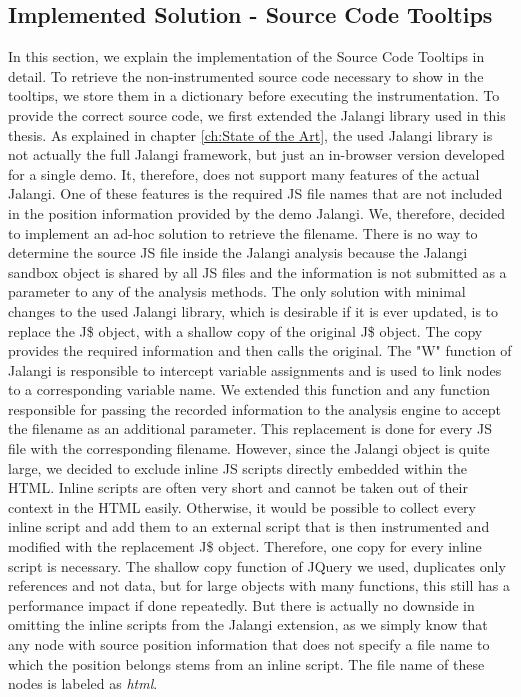 \subsection{Implemented Solution - Source Code Tooltips}
In this section, we explain the implementation of the Source Code Tooltips in detail. To retrieve the non-instrumented source code necessary to show in the tooltips, we store them in a dictionary before executing the instrumentation. To provide the correct source code, we first extended the Jalangi library used in this thesis. As explained in chapter \ref{ch:State of the Art}, the used Jalangi library is not actually the full Jalangi framework, but just an in-browser version developed for a single demo. It, therefore, does not support many features of the actual Jalangi. One of these features is the required JS file names that are not included in the position information provided by the demo Jalangi. We, therefore, decided to implement an ad-hoc solution to retrieve the filename. There is no way to determine the source JS file inside the Jalangi analysis because the Jalangi sandbox object is shared by all JS files and the information is not submitted as a parameter to any of the analysis methods. The only solution with minimal changes to the used Jalangi library, which is desirable if it is ever updated, is to replace the J\$ object, with a shallow copy of the original J\$ object. The copy provides the required information and then calls the original. The "W" function of Jalangi is responsible to intercept variable assignments and is used to link nodes to a corresponding variable name. We extended this function and any function responsible for passing the recorded information to the analysis engine to accept the filename as an additional parameter. This replacement is done for every JS file with the corresponding filename. However, since the Jalangi object is quite large, we decided to exclude inline JS scripts directly embedded within the HTML. Inline scripts are often very short and cannot be taken out of their context in the HTML easily. Otherwise, it would be possible to collect every inline script and add them to an external script that is then instrumented and modified with the replacement J\$ object. Therefore, one copy for every inline script is necessary. The shallow copy function of JQuery we used, duplicates only references and not data, but for large objects with many functions, this still has a performance impact if done repeatedly.%
 But there is actually no downside in omitting the inline scripts from the Jalangi extension, as we simply know that any node with source position information that does not specify a file name to which the position belongs stems from an inline script. The file name of these nodes is labeled as \emph{html}.\\
